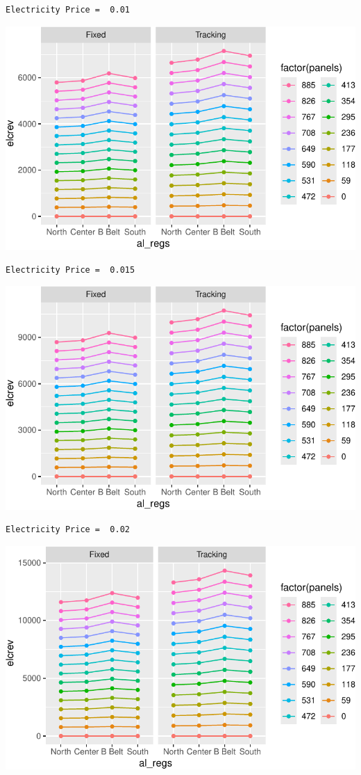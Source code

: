 \documentclass[
  letterpaper,
  DIV=11,
  numbers=noendperiod]{scrartcl}
\begin{document}
\begin{verbatim}
Electricity Price =  0.01
\end{verbatim}

\includegraphics{Simulation_files/figure-pdf/unnamed-chunk-20-1.pdf}

\begin{verbatim}
Electricity Price =  0.015
\end{verbatim}

\includegraphics{Simulation_files/figure-pdf/unnamed-chunk-20-2.pdf}

\begin{verbatim}
Electricity Price =  0.02
\end{verbatim}

\includegraphics{Simulation_files/figure-pdf/unnamed-chunk-20-3.pdf}
\end{document}
